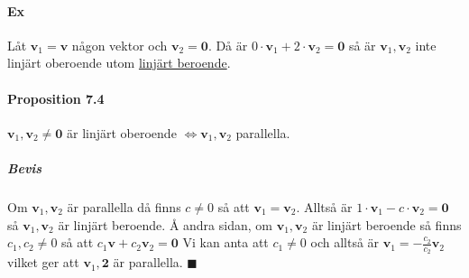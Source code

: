 \paragraph{Ex} Låt $\bm{v}_{1}=\bm{v}$ någon vektor och $\bm{v}_{2}=\bm{0}$.
Då är $0\cdot\bm{v}_{1}+2\cdot \bm{v}_{2}=\bm{0}$ så är $\bm{v}_{1},\bm{v}_{2}$ inte linjärt oberoende utom \underline{linjärt beroende}.

\paragraph{Proposition 7.4} $\bm{v}_{1},\bm{v}_{2}\neq \bm{0}$ är linjärt oberoende $\Leftrightarrow \bm{v}_{1},\bm{v}_{2}$ parallella.
\subparagraph{Bevis} Om $\bm{v}_{1},\bm{v}_{2}$ är parallella då finns $c\neq 0$ så att $\bm{v}_{1}=\bm{v}_{2}$.
Alltså är $1\cdot \bm{v}_{1}-c\cdot \bm{v}_{2} = \bm{0}$ så $\bm{v}_{1},\bm{v}_{2}$ är linjärt beroende.
Å andra sidan, om $\bm{v}_{1},\bm{v}_{2}$ är linjärt beroende så finns $c_{1},c_{2} \neq 0$ så att $c_{1}\bm{v}+c_{2}\bm{v}_{2}=\bm{0}$
Vi kan anta att $c_{1}\neq 0$ och alltså är $\bm{v}_{1}=-\frac{c_{2}}{c_{2}}\bm{v}_{2}$ vilket ger att $\bm{v}_{1},\bm{2}$ är parallella. $\blacksquare$

